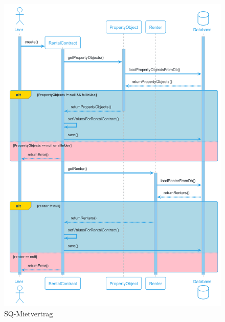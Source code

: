 \begin{figure}[H]
  \begin{center}
    \includegraphics[width=1\linewidth]{content/diagrams/out/sequenzdiagram/mietvertrag/mietvertrag.png}
    \caption{SQ-Mietvertrag}
    \label{sqMietvertrag}
  \end{center}
\end{figure}

